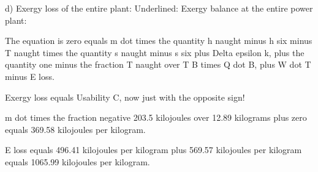 d) Exergy loss of the entire plant:
Underlined: Exergy balance at the entire power plant:

The equation is zero equals m dot times the quantity h naught minus h six minus T naught times the quantity s naught minus s six plus Delta epsilon k, plus the quantity one minus the fraction T naught over T B times Q dot B, plus W dot T minus E loss.

Exergy loss equals Usability C, now just with the opposite sign!

m dot times the fraction negative 203.5 kilojoules over 12.89 kilograms plus zero equals 369.58 kilojoules per kilogram.

E loss equals 496.41 kilojoules per kilogram plus 569.57 kilojoules per kilogram equals 1065.99 kilojoules per kilogram.